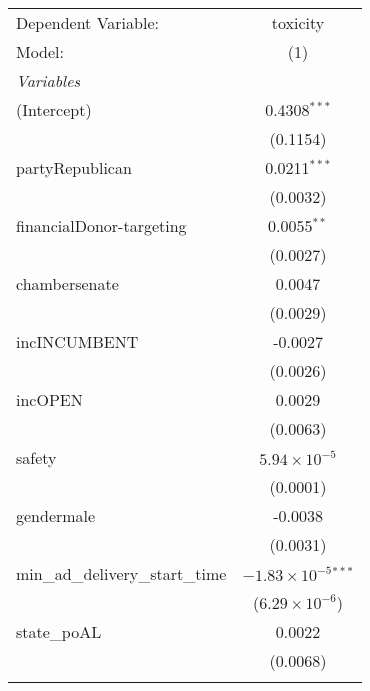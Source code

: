 \begingroup
\centering
\begin{tabular}{lc}
   \tabularnewline \midrule \midrule
   Dependent Variable:                                & toxicity\\  
   Model:                                             & (1)\\  
   \midrule
   \emph{Variables}\\
   (Intercept)                                        & 0.4308$^{***}$\\   
                                                      & (0.1154)\\   
   partyRepublican                                    & 0.0211$^{***}$\\   
                                                      & (0.0032)\\   
   financialDonor-targeting                           & 0.0055$^{**}$\\   
                                                      & (0.0027)\\   
   chambersenate                                      & 0.0047\\   
                                                      & (0.0029)\\   
   incINCUMBENT                                       & -0.0027\\   
                                                      & (0.0026)\\   
   incOPEN                                            & 0.0029\\   
                                                      & (0.0063)\\   
   safety                                             & $5.94\times 10^{-5}$\\    
                                                      & (0.0001)\\   
   gendermale                                         & -0.0038\\   
                                                      & (0.0031)\\   
   min\_ad\_delivery\_start\_time                     & $-1.83\times 10^{-5}$$^{***}$\\    
                                                      & ($6.29\times 10^{-6}$)\\    
   state\_poAL                                        & 0.0022\\   
                                                      & (0.0068)\\   
$$
\end{tabular}

